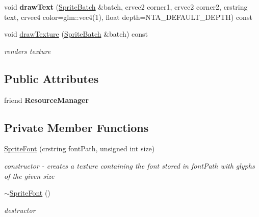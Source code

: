 \begin{DoxyCompactItemize}
\mbox{\label{classnta_1_1SpriteFont_aafd62af3ce6a44354c07a372ba6db2fe}} 
void {\bfseries draw\+Text} (\hyperlink{classnta_1_1SpriteBatch}{Sprite\+Batch} \&batch, crvec2 corner1, crvec2 corner2, crstring text, crvec4 color=glm\+::vec4(1), float depth=N\+T\+A\+\_\+\+D\+E\+F\+A\+U\+L\+T\+\_\+\+D\+E\+P\+TH) const
\item 
\mbox{\label{classnta_1_1SpriteFont_ac5e60e0a7b6f9c0302c81f0d5b6628cc}} 
void \hyperlink{classnta_1_1SpriteFont_ac5e60e0a7b6f9c0302c81f0d5b6628cc}{draw\+Texture} (\hyperlink{classnta_1_1SpriteBatch}{Sprite\+Batch} \&batch) const
\begin{DoxyCompactList}\small\item\em renders texture \end{DoxyCompactList}\end{DoxyCompactItemize}
\subsection*{Public Attributes}
\begin{DoxyCompactItemize}
\item 
\mbox{\label{classnta_1_1SpriteFont_a1db301b9555c86340ea57bb2c5485dfc}} 
friend {\bfseries Resource\+Manager}
\end{DoxyCompactItemize}
\subsection*{Private Member Functions}
\begin{DoxyCompactItemize}
\item 
\mbox{\label{classnta_1_1SpriteFont_a9dc96f31efd0830dcb476ea87534e358}} 
\hyperlink{classnta_1_1SpriteFont_a9dc96f31efd0830dcb476ea87534e358}{Sprite\+Font} (crstring font\+Path, unsigned int size)
\begin{DoxyCompactList}\small\item\em constructor -\/ creates a texture containing the font stored in font\+Path with glyphs of the given size \end{DoxyCompactList}\item 
\mbox{\label{classnta_1_1SpriteFont_aa5292a1131ab6e04e23f282d2b067146}} 
\hyperlink{classnta_1_1SpriteFont_aa5292a1131ab6e04e23f282d2b067146}{$\sim$\+Sprite\+Font} ()
\begin{DoxyCompactList}\small\item\em destructor \end{DoxyCompactList}\end{DoxyCompactItemize}
